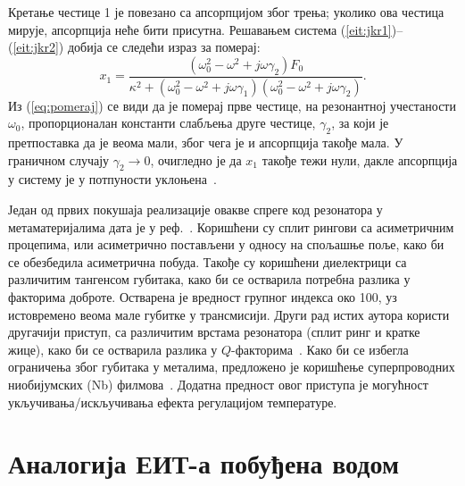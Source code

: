 \documentclass[main.tex]{subfiles}
\begin{document}

Кретање честице 1 је повезано са апсорпцијом због трења; уколико ова честица мирује, апсорпција неће бити присутна. Решавањем система (\ref{eit:jkr1})–(\ref{eit:jkr2}) добија се следећи израз за померај:
\begin{equation}
    \label{eq:pomeraj}
    x_1 = \frac{\left( \omega_0^2 - \omega^2 + j\omega\gamma_2 \right)F_0}{\kappa^2 + \left( \omega_0^2 - \omega^2 + j\omega\gamma_1 \right) \left( \omega_0^2 - \omega^2 + j\omega\gamma_2   \right)}.
\end{equation}
Из (\ref{eq:pomeraj}) се види да је померај прве честице, на резонантној учестаности $\omega_0$, пропорционалан константи слабљења друге честице, $\gamma_2$, за који је претпоставка да је веома мали, због чега је и апсорпција такође мала. У граничном случају $\gamma_2\to 0$, очигледно је да $x_1$ такође тежи нули, дакле апсорпција у систему је у потпуности уклоњена~\cite{garrido2002classical}.

Један од првих покушаја реализације овакве спреге код резонатора у метаматеријалима дата је у реф.~\cite{tassin:09}. Коришћени су сплит рингови са асиметричним процепима, или асиметрично постављени у односу на спољашње поље, како би се обезбедила асиметрична побуда. Такође су коришћени диелектрици са различитим тангенсом губитака, како би се остварила потребна разлика у факторима доброте. Остварена је вредност групног индекса око 100, уз истовремено веома мале губитке у трансмисији. Други рад истих аутора користи другачији приступ, са различитим врстама резонатора (сплит ринг и кратке жице), како би се остварила разлика у $Q$-факторима~\cite{tassin2009planar}. Како би се избегла ограничења због губитака у металима, предложено је коришћење суперпроводних ниобијумских (Nb) филмова~\cite{cihan}. Додатна предност овог приступа је могућност укључивања/искључивања ефекта регулацијом температуре.

\section{Аналогија ЕИТ-а побуђена водом}%
\label{sec:analogija_eit_a_pobudjena_vodom}
\end{document}
